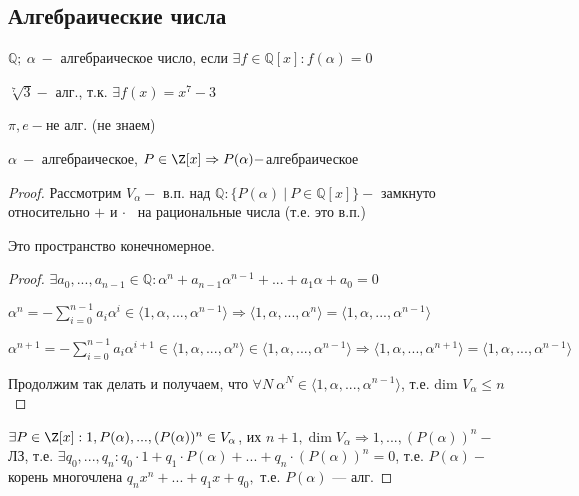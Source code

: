 \subsection{Алгебраические числа}

\begin{definition}
    $\mathbb{Q};\ \alpha\ -$ алгебраическое число, если $\exists f\in 
\mathbb{Q}[x]:f(\alpha)=0$
\end{definition}

\begin{example}
    $\sqrt[7]{3}-$ алг., т.к. $\exists f(x)=x^7-3$ 
    
    $\pi, e-$не алг. (не знаем)
\end{example}

\begin{theorem}
    $\alpha\ -$  алгебраическое, $P\in\Z[x]\Rightarrow 
P(\alpha)-$алгебраическое
\end{theorem}

\begin{proof}
    Рассмотрим $V_{\alpha}-$ в.п. над $\mathbb{Q}:\{P(\alpha)\ |\ 
P\in\mathbb{Q}[x]\}-$ замкнуто относительно $+$ и $\cdot$    на 
рациональные числа (т.е. это в.п.)
    \begin{statement}
        Это пространство конечномерное.
    \end{statement}
    \begin{proof}
        $\exists 
a_0,...,a_{n-1}\in\mathbb{Q}:\alpha^n+a_{n-1}\alpha^{n-1}+...+a_1\alpha+a_0=0$
        
        
$\alpha^n=-\sum\limits_{i=0}^{n-1}a_i\alpha^{i}\in\langle1,\alpha,...,\alpha^{n-1}\rangle 
\Rightarrow 
\langle1,\alpha,...,\alpha^n\rangle=\langle1,\alpha,...,\alpha^{n-1}\rangle$ 
        
        
$\alpha^{n+1}=-\sum\limits_{i=0}^{n-1}a_i\alpha^{i+1}\in\langle1,\alpha,...,\alpha^{n}\rangle\in\langle1,\alpha,...,\alpha^{n-1}\rangle 
\Rightarrow 
\langle1,\alpha,...,\alpha^{n+1}\rangle=\langle1,\alpha,...,\alpha^{n-1}\rangle$ 
        
        Продолжим так делать и получаем, что $\forall N\ 
\alpha^{N}\in\langle 1,\alpha,..., \alpha^{n-1}\rangle$, т.е. $\text{dim 
}V_{\alpha}\leq n$        
    \end{proof}
    $\exists P\in\Z[x]:1,P(\alpha),...,(P(\alpha))^n\in V_{\alpha}$, их 
$n+1,\dim V_{\alpha}\Rightarrow1,...,(P(\alpha))^n-$ ЛЗ, т.е. $\exists 
q_0,...,q_n:q_0\cdot1+q_1\cdot  P(\alpha)+...+q_n\cdot (P(\alpha))^n=0$, 
т.е. $P(\alpha)-$ корень многочлена $q_nx^n+...+q_1x+q_0,$ т.е. 
$P(\alpha)$ — алг.
\end{proof}

